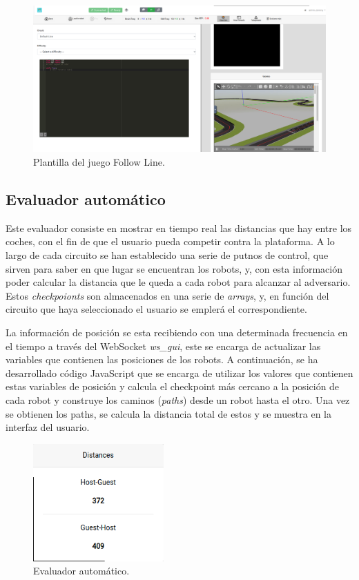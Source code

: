 \documentclass[a4paper, 12pt]{book}
\begin{document}
\begin{figure}[H]
	\centering
    \includegraphics[width=15cm]{img/follow_line_game.png}
    \caption{Plantilla del juego Follow Line.}
    \label{figura:conexion_radi}
\end{figure}

\subsection{Evaluador automático}
\label{follow_line_game_evaluator}

Este evaluador consiste en mostrar en tiempo real las distancias que hay entre los coches, con el fin de que el usuario pueda competir contra la plataforma. A lo largo de cada circuito se han establecido una serie de putnos de control, que sirven para saber en que lugar se encuentran los robots, y, con esta información poder calcular la distancia que le queda a cada robot para alcanzar al adversario. Estos \emph{checkpoionts} son almacenados en una serie de \emph{arrays}, y, en función del circuito que haya seleccionado el usuario se emplerá el correspondiente.

La información de posición se esta recibiendo con una determinada frecuencia en el tiempo a través del WebSocket \emph{ws\_gui}, este se encarga de actualizar las variables que contienen las posiciones de los robots. A continuación, se ha desarrollado código JavaScript que se encarga de utilizar los valores que contienen estas variables de posición y calcula el checkpoint más cercano a la posición de cada robot y construye los caminos (\emph{paths}) desde un robot hasta el otro. Una vez se obtienen los paths, se calcula la distancia total de estos y se muestra en la interfaz del usuario.

\begin{figure}[H]
	\centering
    \includegraphics[width=5cm]{img/evaluator_follow_line.png}
    \caption{Evaluador automático.}
    \label{figura:keyhandler}
\end{figure}
\end{document}
